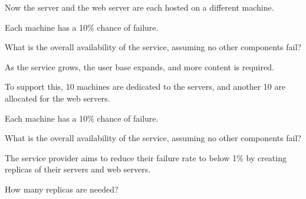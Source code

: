 \begin{slide}


    Now the server and the web server are each hosted on a different machine.
    \bigskip

    Each machine has a 10\% chance of failure.
    \bigskip

    What is the overall availability of the service, assuming no other components fail?

\end{slide}

\begin{slide}


    As the service grows, the user base expands, and more content is required.
    \bigskip

    To support this, 10 machines are dedicated to the servers, and another 10 are allocated for the web servers.
    \bigskip

    Each machine has a 10\% chance of failure.
    \bigskip

    What is the overall availability of the service, assuming no other components fail?

\end{slide}

\begin{slide}
    

    The service provider aims to reduce their failure rate to below 1\% by creating replicas of their servers and web servers.
    \bigskip

    How many replicas are needed?

\end{slide}

